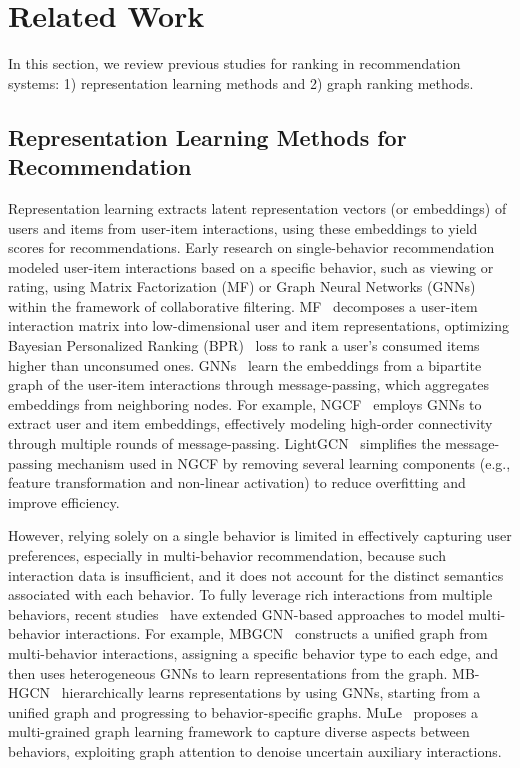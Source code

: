 \section{Related Work}
\label{sec:related}
In this section, we review previous studies for ranking in recommendation systems: 1) representation learning methods and 2) graph ranking methods.

\subsection{Representation Learning Methods for Recommendation}
\label{sec:related:rl}
Representation learning extracts latent representation vectors (or embeddings) of users and items from user-item interactions, using these embeddings to yield scores for recommendations.
Early research on single-behavior recommendation modeled user-item interactions based on a specific behavior, such as viewing or rating, using Matrix Factorization (MF) or Graph Neural Networks (GNNs) within the framework of collaborative filtering.
MF~\cite{RendleRFGS12} decomposes a user-item interaction matrix into low-dimensional user and item representations, optimizing Bayesian Personalized Ranking (BPR)~\cite{RendleRFGS12} loss to rank a user’s consumed items higher than unconsumed ones.
GNNs~\cite{KipfKW16} learn the embeddings from a bipartite graph of the user-item interactions through message-passing, which aggregates embeddings from neighboring nodes.
For example, NGCF~\cite{WangWHWFC19} employs GNNs to extract user and item embeddings, effectively modeling high-order connectivity through multiple rounds of message-passing. 
LightGCN~\cite{HeHDWLZW20} simplifies the message-passing mechanism used in NGCF by removing several learning components (e.g., feature transformation and non-linear activation) to reduce overfitting and improve  efficiency.

However, relying solely on a single behavior is limited in effectively capturing user preferences, especially in multi-behavior recommendation, because such interaction data is insufficient, and it does not account for the distinct semantics associated with each behavior.
To fully leverage rich interactions from  multiple behaviors, recent studies~\cite{MengZGGLZZTLZ23} have extended GNN-based approaches to model multi-behavior interactions.
For example, MBGCN~\cite{JinJGHJL20} constructs a unified graph from multi-behavior interactions, assigning a specific behavior type to each edge, and then uses heterogeneous GNNs to learn representations from the graph.
MB-HGCN~\cite{YanYCSSP23} hierarchically learns representations by using GNNs, starting from a unified graph and progressing to behavior-specific graphs.
MuLe~\cite{LeeLKSJ24xxaw} proposes a multi-grained graph learning framework to capture diverse aspects between behaviors, exploiting graph attention to denoise uncertain auxiliary interactions.

